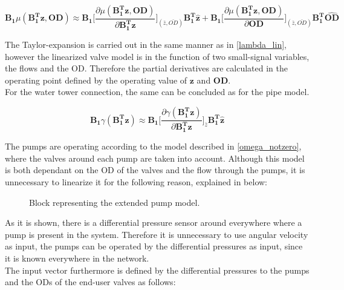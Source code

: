 \begin{equation}
  \pmb{B_1} \mu(\pmb{{B_1^{T}}}\pmb{z}, \pmb{OD}) \approx 
  \pmb{B_1} \bigg[ \frac{\partial{\mu(\pmb{{B_1^{T}}}\pmb{z}, \pmb{OD})}}{{\partial{\pmb{{B_1^{T}}}\pmb{z}}}}  \bigg]_{(\bar{z}, \bar{OD})} \pmb{{B_1^{T}}} \pmb{\hat{z}}
 +  \pmb{B_1} \bigg[ \frac{\partial{\mu(\pmb{{B_1^{T}}}\pmb{z}, \pmb{OD})}}{{\partial{\pmb{OD}}}}  \bigg]_{(\bar{z}, \bar{OD})} \pmb{{B_1^{T}}} \pmb{\hat{OD}}
\label{mu_lin}
\end{equation}

The Taylor-expansion is carried out in the same manner as in \eqref{lambda_lin}, however the linearized valve model is in the function of two small-signal variables, the flows and the OD. Therefore the partial derivatives are calculated in the operating point defined by the operating value of $\pmb{z}$ and $\pmb{OD}$. 
\\
For the water tower connection, the same can be concluded as for the pipe model. 

\begin{equation}
  \pmb{B_1} \gamma(\pmb{{B_1^{T}}}\pmb{z}) \approx \pmb{B_1} \bigg[ \frac{\partial{\gamma(\pmb{{B_1^{T}}}\pmb{z})}}{{\partial{\pmb{{B_1^{T}}}\pmb{z}}}}   \bigg]_{\bar{z}} \pmb{{B_1^{T}}}\pmb{\hat{z}}
\label{gamma_lin}
\end{equation}

The pumps are operating according to the model described in \eqref{omega_notzero}, where the valves around each pump are taken into account. Although this model is both dependant on the OD of the valves and the flow through the pumps, it is unnecessary to linearize it for the following reason, explained in  below: 

\begin{figure}[H]
\centering
 
\caption{Block representing the extended pump model.}
\label{fig:pump_model_block}
\end{figure}

As it is shown, there is a differential pressure sensor around everywhere where a pump is present in the system. Therefore it is unnecessary to use angular velocity as input, the pumps can be operated by the differential pressures as input, since it is known everywhere in the network. 
\\
The input vector furthermore is defined by the differential pressures to the pumps and the ODs of the end-user valves as follows:

